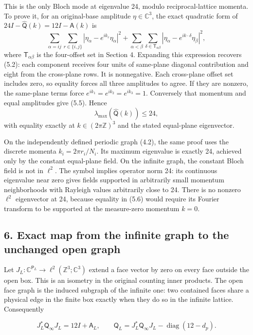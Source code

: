 \documentclass[
  11pt,
]{article}
\begin{document}
This is the only Bloch mode at eigenvalue 24, modulo reciprocal-lattice
momenta. To prove it, for an original-base amplitude
\(\eta\in\mathbb C^3\), the exact quadratic form of
\(24I-\widehat{\mathsf Q}(k)=12I-\widehat{\mathsf A}(k)\) is \[
\sum_{\alpha=ij}\sum_{r\in\{i,j\}}
|\eta_\alpha-e^{ik_r}\eta_\alpha|^2
+\sum_{\alpha<\beta}\sum_{\delta\in\mathsf T_{\alpha\beta}}
|\eta_\alpha-e^{ik\cdot\delta}\eta_\beta|^2,
\tag{5.6}
\] where \(\mathsf T_{\alpha\beta}\) is the four-offset set in Section
4. Expanding this expression recovers (5.2): each component receives
four units of same-plane diagonal contribution and eight from the
cross-plane rows. It is nonnegative. Each cross-plane offset set
includes zero, so equality forces all three amplitudes to agree. If they
are nonzero, the same-plane terms force
\(e^{ik_1}=e^{ik_2}=e^{ik_3}=1\). Conversely that momentum and equal
amplitudes give (5.5). Hence \[
\lambda_{\max}(\widehat{\mathsf Q}(k))\le24,
\] with equality exactly at \(k\in(2\pi\mathbb Z)^3\) and the stated
equal-plane eigenvector.

On the independently defined periodic graph (4.2), the same proof uses
the discrete momenta \(k_i=2\pi r_i/N_i\). Its maximum eigenvalue is
exactly 24, achieved only by the constant equal-plane field. On the
infinite graph, the constant Bloch field is not in \(\ell^2\). The
symbol implies operator norm 24: its continuous eigenvalue near zero
gives fields supported in arbitrarily small momentum neighborhoods with
Rayleigh values arbitrarily close to 24. There is no nonzero \(\ell^2\)
eigenvector at 24, because equality in (5.6) would require its Fourier
transform to be supported at the measure-zero momentum \(k=0\).

\subsection{6. Exact map from the infinite graph to the unchanged open
graph}\label{magnetic-part-6-exact-map-from-the-infinite-graph-to-the-unchanged-open-graph}

Let \(J_L:\mathbb C^{\mathsf P_L}\to\ell^2(\mathbb Z^3;\mathbb C^3)\)
extend a face vector by zero on every face outside the open box. This is
an isometry in the original counting inner products. The open face graph
is the induced subgraph of the infinite one: two contained faces share a
physical edge in the finite box exactly when they do so in the infinite
lattice. Consequently

\[
\boxed{
J_L^*\mathsf Q_\infty J_L=12I+\mathsf A_L,\qquad
\mathsf Q_L=J_L^*\mathsf Q_\infty J_L
-\operatorname{diag}(12-d_p).}
\tag{6.1}
\]
\end{document}
